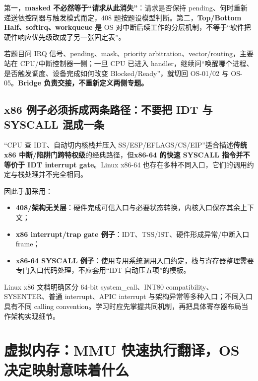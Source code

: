 \documentclass[11pt,a4paper]{ctexart}
\newcommand{\kw}[1]{\textbf{#1}}
\begin{document}
\begin{warn}[两个常见过度简化]
第一，\kw{masked 不必然等于“请求从此消失”}：请求是否保持 pending、何时重新递送依控制器与触发模式而定，408 题按题设模型判断。第二，\kw{Top/Bottom Half、softirq、workqueue} 是 OS 对中断后续工作的分层机制，不等于“软件把硬件响应优先级改成了另一张固定表”。
\end{warn}

\begin{method}
若题目问 IRQ 信号、pending、mask、priority arbitration、vector/routing，主要站在 CPU/中断控制器一侧；一旦 CPU 已进入 handler，继续问“唤醒哪个进程、是否触发调度、设备完成如何改变 Blocked/Ready”，就切回 OS-01/02 与 OS-05。\kw{Bridge 负责交接，不重新定义两侧专题。}
\end{method}

\subsection{x86 例子必须拆成两条路径：不要把 IDT 与 SYSCALL 混成一条}
\begin{warn}
“CPU 查 IDT、自动切内核栈并压入 SS/ESP/EFLAGS/CS/EIP”适合描述\kw{传统 x86 中断/陷阱门跨特权级}的经典路径，但\kw{x86-64 的快速 SYSCALL 指令并不等价于 IDT interrupt gate}。Linux x86-64 也存在多种不同入口，它们的调用约定与栈处理并不完全相同。
\end{warn}

因此手册采用：
\begin{itemize}
  \item \kw{408/架构无关层}：硬件完成可信入口与必要状态转换，内核入口保存其余上下文；
  \item \kw{x86 interrupt/trap gate 例子}：IDT、TSS/IST、硬件形成异常/中断入口 frame；
  \item \kw{x86-64 SYSCALL 例子}：使用专用系统调用入口约定，栈与寄存器整理需要专门入口代码处理，不应套用“IDT 自动压五项”的模板。
\end{itemize}

\begin{eng}[工程边界]
Linux x86 文档明确区分 64-bit system\_call、INT80 compatibility、SYSENTER、普通 interrupt、APIC interrupt 与架构异常等多种入口；不同入口具有不同 calling convention。学习时应先掌握共同机制，再把具体寄存器布局当作架构实现细节。
\end{eng}

\section{虚拟内存：MMU 快速执行翻译，OS 决定映射意味着什么}
\end{document}

